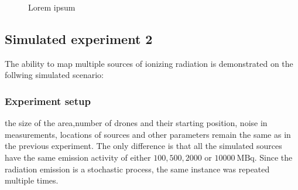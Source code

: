 {\begin{figure}[!htb]
{    \label{e2:sen2}
  }
  \newline
  \noindent
  \caption{Lorem ipsum}
  \label{fig:e2}
\end{figure}%
}

\subsection{Simulated experiment 2}
The ability to map multiple sources of ionizing radiation is demonstrated on the follwing simulated scenario:
\subsubsection{Experiment setup}
the size of the area,number of drones and their starting position, noise in measurements, locations of sources and other parameters remain the same as in the previous experiment.
The only difference is that all the simulated sources have the same emission activity of either $100, 500, 2000$ or $10000\ \si{\mega\becquerel}$.
Since the radiation emission is a stochastic process, the same instance was repeated multiple times.




